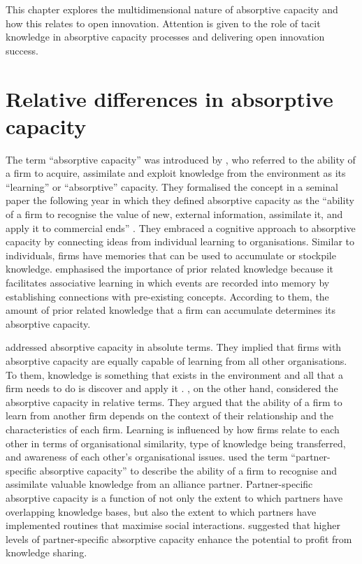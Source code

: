 This chapter explores the multidimensional nature of absorptive capacity and how this relates to open innovation. Attention is given to the role of tacit knowledge in absorptive capacity processes and delivering open innovation success. \medskip

\section{Relative differences in absorptive capacity} 

The term \enquote{absorptive capacity} was introduced by \citet{cohen1989innovation}, who referred to the ability of a firm to acquire, assimilate and exploit knowledge from the environment as its \enquote{learning} or \enquote{absorptive} capacity. They formalised the concept in a seminal paper the following year in which they defined absorptive capacity as the \enquote{ability of a firm to recognise the value of new, external information, assimilate it, and apply it to commercial ends} \citep{cohen1990absorptive}. They embraced a cognitive approach to absorptive capacity by connecting ideas from individual learning to organisations. Similar to individuals, firms have memories that can be used to accumulate or stockpile knowledge. \citet{cohen1990absorptive} emphasised the importance of prior related knowledge because it facilitates associative learning in which events are recorded into memory by establishing connections with pre-existing concepts. According to them, the amount of prior related knowledge that a firm can accumulate determines its absorptive capacity. \medskip

\citet{cohen1990absorptive} addressed absorptive capacity in absolute terms. They implied that firms with absorptive capacity are equally capable of learning from all other organisations. To them, knowledge is something that exists in the environment and all that a firm needs to do is discover and apply it \citep{omidvar2013revisiting}. \citet{lane1998relative}, on the other hand, considered the absorptive capacity in relative terms. They argued that the ability of a firm to learn from another firm depends on the context of their relationship and the characteristics of each firm. Learning is influenced by how firms relate to each other in terms of organisational similarity, type of knowledge being transferred, and awareness of each other's organisational issues. \citet{dyer1998relational} used the term \enquote{partner-specific absorptive capacity} to describe the ability of a firm to recognise and assimilate valuable knowledge from an alliance partner. Partner-specific absorptive capacity is a function of not only the extent to which partners have overlapping knowledge bases, but also the extent to which partners have implemented routines that maximise social interactions. \citet{dyer1998relational} suggested that higher levels of partner-specific absorptive capacity enhance the potential to profit from knowledge sharing. \medskip

